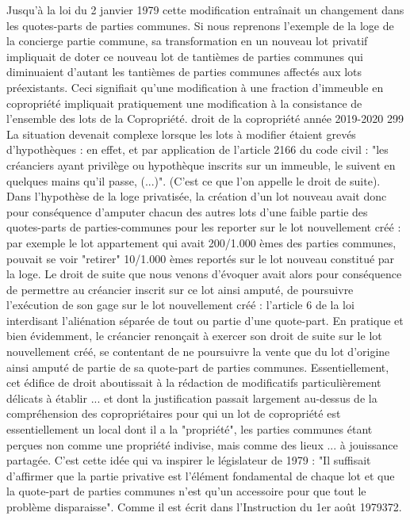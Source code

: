 		Jusqu'à la loi du 2 janvier 1979 cette modification entraînait un changement dans les quotes-parts de parties communes.
		Si nous reprenons l'exemple de la loge de la concierge partie commune, sa transformation en un nouveau lot privatif impliquait de doter ce nouveau lot de tantièmes de parties communes qui diminuaient d'autant les tantièmes de parties communes affectés aux lots préexistants.
		Ceci signifiait qu'une modification à une fraction d'immeuble en copropriété impliquait pratiquement une modification à la consistance de l'ensemble des lots de la Copropriété.
		droit de la copropriété année 2019-2020
		299
		La situation devenait complexe lorsque les lots à modifier étaient grevés d'hypothèques : en effet, et par application de l'article 2166 du code civil : "les créanciers ayant privilège ou hypothèque inscrits sur un immeuble, le suivent en quelques mains qu'il passe, (...)". (C'est ce que l'on appelle le droit de suite).
		Dans l'hypothèse de la loge privatisée, la création d'un lot nouveau avait donc pour conséquence d'amputer chacun des autres lots d'une faible partie des quotes-parts de parties-communes pour les reporter sur le lot nouvellement créé : par exemple le lot appartement qui avait 200/1.000 èmes des parties communes, pouvait se voir "retirer" 10/1.000 èmes reportés sur le lot nouveau constitué par la loge.
		Le droit de suite que nous venons d'évoquer avait alors pour conséquence de permettre au créancier inscrit sur ce lot ainsi amputé, de poursuivre l’exécution de son gage sur le lot nouvellement créé : l'article 6 de la loi interdisant l'aliénation séparée de tout ou partie d'une quote-part.
		En pratique et bien évidemment, le créancier renonçait à exercer son droit de suite sur le lot nouvellement créé, se contentant de ne poursuivre la vente que du lot d'origine ainsi amputé de partie de sa quote-part de parties communes.
		Essentiellement, cet édifice de droit aboutissait à la rédaction de modificatifs particulièrement délicats à établir ... et dont la justification passait largement au-dessus de la compréhension des copropriétaires pour qui un lot de copropriété est essentiellement un local dont il a la "propriété", les parties communes étant perçues non comme une propriété indivise, mais comme des lieux ... à jouissance partagée.
		C'est cette idée qui va inspirer le législateur de 1979 : "Il suffisait d'affirmer que la partie privative est l'élément fondamental de chaque lot et que la quote-part de parties communes n'est qu'un accessoire pour que tout le problème disparaisse". Comme il est écrit dans l'Instruction du 1er août 1979372.
	
